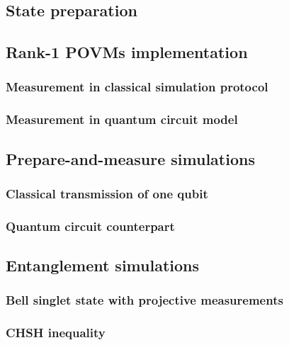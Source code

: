 \subsection{State preparation}

\subsection{Rank-1 POVMs implementation}
\subsubsection{Measurement in classical simulation protocol}
\subsubsection{Measurement in quantum circuit model}
\subsection{Prepare-and-measure simulations}
\subsubsection{Classical transmission of one qubit}
\subsubsection{Quantum circuit counterpart}

\subsection{Entanglement simulations}
\subsubsection{Bell singlet state with projective measurements}
\subsubsection{CHSH inequality}